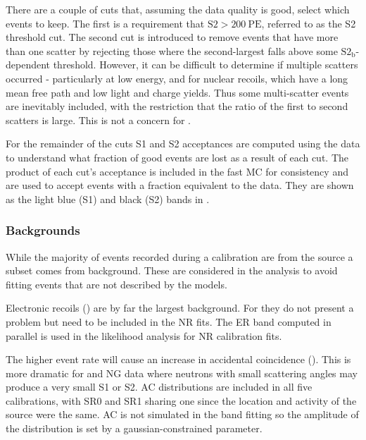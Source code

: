 There are a couple of cuts that, assuming the data quality is good, select which events to keep.  The first is a requirement that
$\mathrm{S2} > 200\ \mathrm{PE}$, referred to as the S2 threshold cut.  The second cut is introduced to remove events that have more than
one scatter by rejecting those where the second-largest \stwob falls above some $\mathrm{S2_b}$-dependent threshold.  However, it can be
difficult to determine if multiple scatters occurred - particularly at low energy, and for nuclear
recoils, which have a long mean free path and low light and charge yields.  Thus some multi-scatter events are inevitably included,
with the restriction that the ratio of the first to second scatters is large.  This is not a concern for .

For the remainder of the cuts S1 and S2 acceptances are computed using the data to understand what fraction of good events are lost
as a result of each cut.  The product of each cut's acceptance is included in the fast MC for consistency and are used to accept events
with a fraction equivalent to the data.  They are shown as the light blue (S1) and
black (S2) bands in .



\subsubsection{Backgrounds}
\label{subsubsec:er_nr_calibrations_parameter_determ_additional_components}
While the majority of events recorded during a calibration are from the source a subset comes
from background.  These are considered in the analysis to avoid fitting events that are not described by the models.

Electronic recoils () are by far the largest background.  For 
they do not present a problem but need to be included in the NR fits.  The ER band computed in parallel is used in the likelihood
analysis for NR calibration fits.

The higher event rate will cause an increase in accidental coincidence ().  This is more dramatic
for \ambe and NG data where neutrons with small scattering angles may produce a very small S1 or S2.  AC distributions are included
in all five calibrations, with SR0 and SR1 \ambe sharing one since the location and activity of the source were the same.  AC is not
simulated in the band fitting so the amplitude of the distribution is set by a gaussian-constrained parameter.

